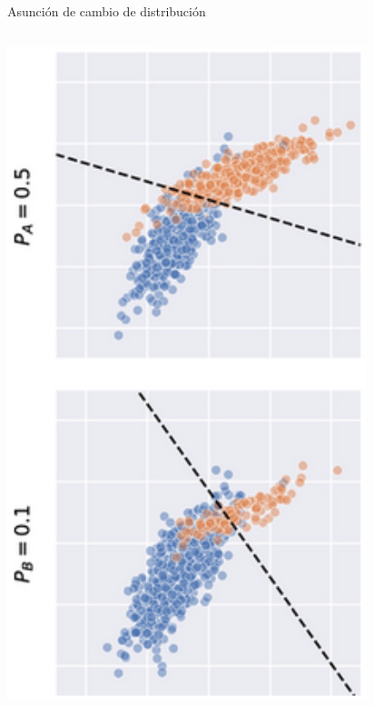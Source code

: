 \documentclass{beamer}
\begin{document}
\begin{frame}{Asunción de cambio de distribución}
\begin{columns}
\begin{column}{0.4\textwidth}
        \includegraphics[width=\linewidth]{images/pps.png} 
    \end{column}
\end{columns}
\end{frame}
\end{document}
